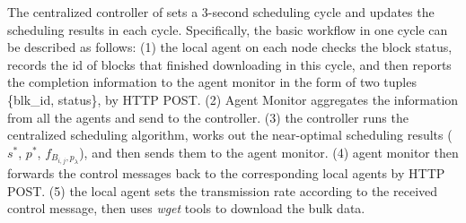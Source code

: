 The centralized controller of \name sets a 3-second scheduling cycle and updates the scheduling results in each cycle. Specifically, the basic workflow in one cycle can be described as follows: (1) the local agent on each node checks the block status, records the id of blocks that finished downloading in this cycle, and then reports the completion information to the agent monitor in the form of two tuples \{blk\_id, status\}, by HTTP POST. (2) Agent Monitor aggregates the information from all the agents and send to the controller. (3) the controller runs the centralized scheduling algorithm, works out the near-optimal scheduling results ($s^*$, $p^*$, $f_{B_{i,j},p_\lambda}$), and then sends them to the agent monitor. (4) agent monitor then forwards the control messages back to the corresponding local agents by HTTP POST. (5) the local agent sets the transmission rate according to the received control message, then uses \emph{wget} tools to download the bulk data.

